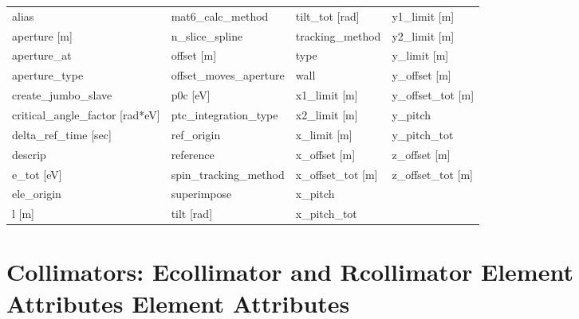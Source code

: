  \begin{tabular}{llll} \toprule
alias                          & mat6_calc_method               & tilt_tot [rad]                 & y1_limit [m]                   \\
aperture [m]                   & n_slice_spline                 & tracking_method                & y2_limit [m]                   \\
aperture_at                    & offset [m]                     & type                           & y_limit [m]                    \\
aperture_type                  & offset_moves_aperture          & wall                           & y_offset [m]                   \\
create_jumbo_slave             & p0c [eV]                       & x1_limit [m]                   & y_offset_tot [m]               \\
critical_angle_factor [rad*eV] & ptc_integration_type           & x2_limit [m]                   & y_pitch                        \\
delta_ref_time [sec]           & ref_origin                     & x_limit [m]                    & y_pitch_tot                    \\
descrip                        & reference                      & x_offset [m]                   & z_offset [m]                   \\
e_tot [eV]                     & spin_tracking_method           & x_offset_tot [m]               & z_offset_tot [m]               \\
ele_origin                     & superimpose                    & x_pitch                        &                                \\
l [m]                          & tilt [rad]                     & x_pitch_tot                    &                                \\
 \bottomrule
 \end{tabular}
 \vfill

 \section{Collimators: Ecollimator and Rcollimator Element Attributes Element Attributes}
 \label{s:list.collimator}

